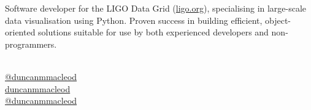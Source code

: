 \begin{minipage}[b]{.65\textwidth}
    Software developer for the LIGO Data Grid (\href{http://www.ligo.org}{ligo.org}), specialising in large-scale data visualisation using Python.
    Proven success in building efficient, object-oriented solutions suitable for use by both experienced developers and non-programmers.
\end{minipage}
\hspace{.02\textwidth}
{\color{gray} \vrule{}}
\hspace{.02\textwidth}
\begin{minipage}[b]{.25\textwidth}
    \vspace{.1cm}\\
    \href{https://github.com/duncanmmacleod}{\githubsocialsymbol @duncanmmacleod}\\
    \href{https://www.linkedin.com/in/duncanmmacleod}{\linkedinsocialsymbol duncanmmacleod}\\
    \href{https://twitter.com/duncanmmacleod}{\twittersocialsymbol @duncanmmacleod}
\end{minipage}
